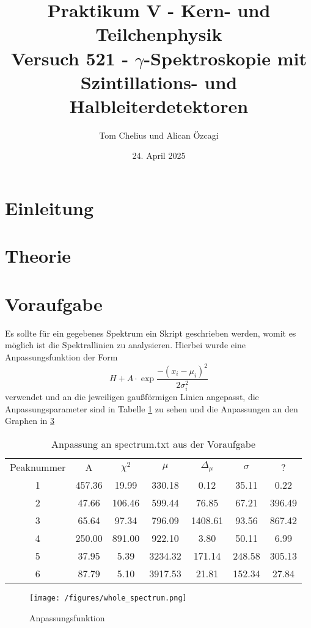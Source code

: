 \documentclass{article}
\title{Praktikum V - Kern- und Teilchenphysik\\Versuch 521 - $\gamma$-Spektroskopie mit Szintillations- und Halbleiterdetektoren}
\author{Tom Chelius und Alican Özcagi}
\date{24. April 2025}
\begin{document}
\maketitle
\tableofcontents

\newpage
\section{Einleitung}

\section{Theorie}

\section{Voraufgabe}
Es sollte für ein gegebenes Spektrum ein Skript geschrieben werden, womit es möglich ist die Spektrallinien zu analysieren. Hierbei wurde eine Anpassungsfunktion der Form
\begin{equation}
    H + A \cdot \exp{\frac{-(x_i-\mu_i )^2}{2 \sigma_i^2}}
\end{equation}
verwendet und an die jeweiligen gaußförmigen Linien angepasst, die Anpassungsparameter sind in Tabelle \ref{tab:voraufgabe} zu sehen und die Anpassungen an den Graphen in \ref{}


\begin{table}
    \centering
    \begin{tabular}{|c|c|c|c|c|c|c|} \hline
      Peaknummer & A & $\chi^2$ & $\mu$ & $\Delta_{\mu}$ & $\sigma$ & ?\\
        1 & 457.36 & 19.99 & 330.18 & 0.12 & 35.11 & 0.22 \\ \hline
        2 & 47.66 & 106.46 & 599.44 & 76.85 & 67.21 & 396.49\\ \hline
        3 & 65.64 & 97.34 &  796.09 & 1408.61 & 93.56 & 867.42\\ \hline
        4 & 250.00 & 891.00 & 922.10 & 3.80 & 50.11 & 6.99\\ \hline
        5 & 37.95 & 5.39 & 3234.32 & 171.14 & 248.58 & 305.13\\ \hline
        6 & 87.79 & 5.10 & 3917.53 & 21.81 & 152.34 & 27.84\\ \hline
    \end{tabular}
    \caption{Anpassung an spectrum.txt aus der Voraufgabe}
    \label{tab:voraufgabe}
\end{table}

\begin{figure}
    \centering
    \texttt{[image: /figures/whole\_spectrum.png]}
    \caption{Anpassungsfunktion}
    \label{fig:voraufgabeFig}
\end{figure}

\newpage
\printbibliography[heading=bibintoc]
\end{document}
